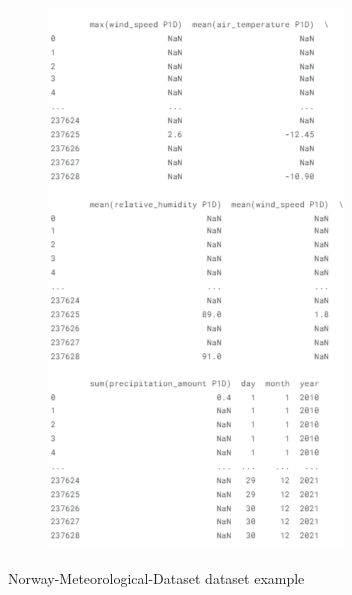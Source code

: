 \documentclass[12pt]{article}
\begin{document}
\begin{figure}[h]
\begin{subfigure}{0.48\textwidth}
      \includegraphics[width=\linewidth]{Nor2.png}
    \end{subfigure}
    \caption{Norway-Meteorological-Dataset dataset example}
    \label{fig:combined2}
  \end{figure}
\end{document}
